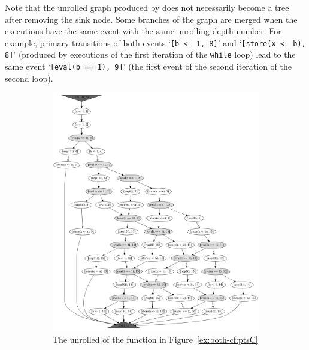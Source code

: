 Note that the unrolled graph produced by \porthos[2] does not necessarily become a tree after removing the sink node.
Some branches of the graph are merged when the executions have the same event with the same unrolling depth number.
For example, primary transitions of both events `\lstinline{[b <- 1, 8]}' and `\lstinline{[store(x <- b), 8]}' (produced by executions of the first iteration of the \texttt{while} loop) lead to the same event `\lstinline{[eval(b == 1), 9]}' (the first event of the second iteration of the second loop).

\begin{figure}[!h]
%
\begin{subfigure}[b]{.6\textwidth}\centering
  \includegraphics[height=.6\textheight,width=\textwidth]{img/my/graphs/unrolling-comparison/PorthosC/t0_unrolled.png}
  \hfill
  \caption{The unrolled \xgraph{} of the function in Figure~\ref{ex:both-cf:ptsC}}
  \label{ex:both-cf:graphU:ptsC}
\end{subfigure}
\hfill
%
\begin{subfigure}[b]{.3\textwidth}\centering

\end{subfigure}
\end{figure}
